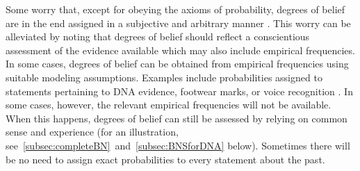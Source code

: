 \documentclass{article}
\newcommand{\pr}{\mathsf{Pr}}
\begin{document}
Some worry that, except for obeying the axioms of probability, degrees of belief are in the end assigned 
in a subjective and arbitrary manner \citep{AllenPardo2019relative}. 
This worry can be  alleviated by noting that degrees of belief should reflect a conscientious assessment of the evidence available which may also include empirical frequencies. In some cases, 
degrees of belief  
can be obtained from empirical frequencies 
using suitable modeling assumptions. Examples include probabilities assigned to statements pertaining to DNA evidence, footwear marks, or voice recognition  \citep[see~\ref{sec:fallacies} below and the examples in ][]{enfs2015}. 
%
In some cases, however, the relevant empirical frequencies will not be available. %
When this happens, degrees of belief can still be assessed by relying on common sense and experience (for an illustration, see~\ref{subsec:completeBN}~and~\ref{subsec:BNSforDNA} below).
%
%
Sometimes there will be no need to assign exact probabilities to every statement about the past. 
\end{document}
